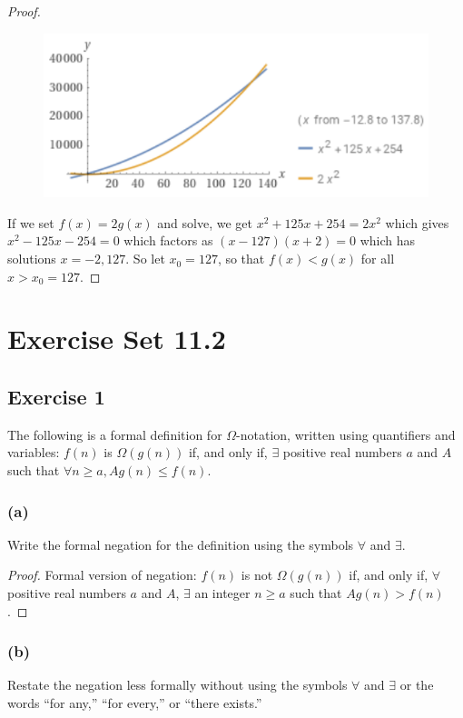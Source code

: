 \documentclass[14pt]{extarticle}
\newcommand{\fa}{\forall}
\newcommand{\te}{\exists}
\begin{document}
\begin{proof}
    \begin{figure}[ht!]
        \centering
        \includegraphics[scale=0.5]{../images/11.1.28.png}
    \end{figure}

    If we set \(f(x) = 2g(x)\) and solve, we get \(x^2 + 125x + 254 = 2x^2\) which gives \(x^2 - 125x - 254 = 0\) which
    factors as \((x-127)(x+2) = 0\) which has solutions \(x = -2, 127\). So let \(x_0 = 127\), so that \(f(x) < g(x)\) for all
    \(x > x_0 = 127\).
\end{proof}

\section{Exercise Set 11.2}

\subsection{Exercise 1}
The following is a formal definition for \(\Omega\)-notation, written using quantifiers and variables: \(f(n)\) is \(\Omega
(g(n))\) if, and only if, \(\te\) positive real numbers \(a\) and \(A\) such that \(\fa n \geq a, Ag(n) \leq f(n)\).

\subsubsection{(a)}
Write the formal negation for the definition using the symbols \(\fa\) and \(\te\).

\begin{proof}
    Formal version of negation: \(f(n)\) is not \(\Omega(g(n))\) if, and only if, \(\fa\) positive real numbers \(a\) and
    \(A\), \(\te\) an integer \(n \geq a\) such that \(Ag(n) > f(n)\).
\end{proof}

\subsubsection{(b)}
Restate the negation less formally without using the symbols \(\fa\) and \(\te\) or the words “for any,” “for every,” or
“there exists.”
\end{document}
